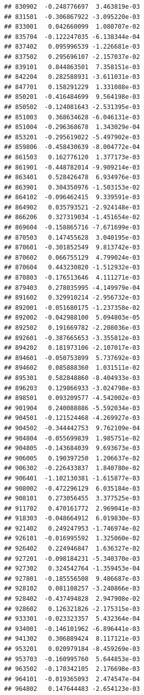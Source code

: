 \begin{frame}[fragile]
\begin{verbatim}
## 830902  -0.248776697  3.463819e-03
## 831501  -0.306867922 -3.095220e-03
## 833001   0.042660099  1.080707e-02
## 835704  -0.122247035 -6.138344e-04
## 837402   0.095996539 -1.226681e-03
## 837502   0.295696107 -2.157037e-02
## 839101   0.844863501  7.358151e-03
## 842204   0.282588931 -3.611031e-03
## 847701   0.158291229  1.331088e-03
## 850201  -0.416484699  9.564198e-03
## 850502  -0.124081643 -2.531395e-03
## 851003   0.368634628 -6.046131e-03
## 851004  -0.296368678  1.343029e-04
## 853201  -0.295619022 -5.497902e-03
## 859806  -0.458430639 -8.004772e-04
## 861503   0.162776120  1.377173e-03
## 861901  -0.448782014 -9.909214e-03
## 863401   0.528426478  6.934976e-03
## 863901   0.304350976 -1.503153e-02
## 864102  -0.096462415  9.339591e-03
## 864902   0.035793521 -2.924148e-03
## 866206   0.327319034 -1.451654e-02
## 869604  -0.158865716 -7.671699e-03
## 870503   0.147455628  3.040195e-03
## 870601  -0.301852549  9.813742e-03
## 870602   0.066755129  4.799024e-03
## 870604   0.443230820 -1.512932e-03
## 870803  -0.176513646  4.111271e-03
## 879403   0.278035995 -4.149979e-04
## 891602   0.329910214 -2.956732e-03
## 892001  -0.051680175 -1.237358e-02
## 892002  -0.042988100  5.094803e-05
## 892502   0.191669782 -2.208036e-03
## 892601  -0.387665653 -3.355812e-03
## 894202   0.181973106 -2.107017e-03
## 894601  -0.050753899  5.737692e-03
## 894602   0.085888360  1.031511e-02
## 895301   0.582848860 -8.404933e-03
## 896203   0.129866933 -3.024798e-03
## 898501   0.093209577 -4.542002e-03
## 901904   0.240088886 -5.592034e-03
## 904501  -0.121524468 -4.269927e-03
## 904502  -0.344442753  9.762109e-04
## 904804  -0.055699839  1.985751e-02
## 904805  -0.143684039  9.693673e-03
## 906005   0.190397250  1.206637e-02
## 906302  -0.226433837  1.840780e-02
## 906401  -1.102130381 -1.615877e-03
## 908002  -0.472296129  6.035184e-03
## 908101   0.273056455  3.377525e-03
## 911702   0.470161772  2.969041e-03
## 918303  -0.048664912  6.019830e-03
## 921402   0.249247953 -1.746974e-02
## 926101  -0.016995592  1.325060e-02
## 926402   0.224946847  1.636327e-02
## 927201  -0.098184231 -5.340370e-03
## 927302   0.324542764 -1.359453e-04
## 927801  -0.185556508  9.486687e-03
## 928102   0.081108257 -3.240866e-03
## 928402  -0.437494828  2.947908e-02
## 928602   0.126321826 -2.175315e-03
## 933301  -0.023323357  5.432364e-04
## 934001  -0.146101962 -6.896441e-03
## 941302   0.306889424  8.117121e-03
## 953201   0.020979184 -8.459269e-03
## 953703  -0.160995760  5.644853e-03
## 963502  -0.170342105  2.176698e-03
## 964101  -0.019365093  2.474547e-04
## 964802   0.147644483 -2.654123e-03

\end{verbatim}
\end{frame}
